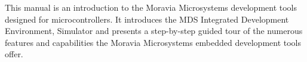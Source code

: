 This manual is an introduction to the Moravia Microsystems development tools designed for microcontrollers. It introduces the MDS Integrated Development Environment, Simulator and presents a step-by-step guided tour of the numerous features and capabilities the Moravia Microsystems embedded development tools offer.
